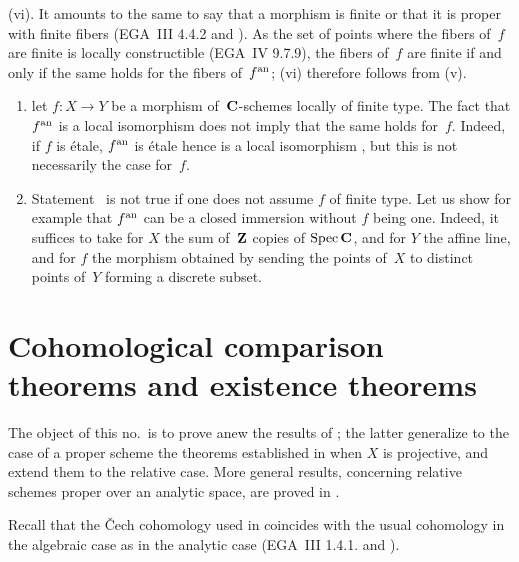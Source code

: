(vi). It amounts to the same to say that a morphism is finite or that it
is proper with finite fibers (EGA~III 4.4.2 and \cite[ \S 5]{XII.4}).
As the set of points where the fibers of~$f$ are finite is
locally constructible (EGA~IV 9.7.9), the fibers of~$f$ are finite
if and only if the same holds for the fibers of~$f^{\mathrm{an}} $; (vi)
therefore follows from (v).

\begin{remark}
\label{XII.3.3}
\begin{enumerate}
\item[a)] let $f \colon X \to Y$ be a morphism of~$\mathbf{C}$-schemes
locally of finite type. The fact that $f^{\mathrm{an}} $ is a local
isomorphism does not imply that the same holds for~$f$. Indeed,
if $f$ is étale, $f^{\mathrm{an}} $ is étale hence is a local
isomorphism \hbox{\cite[ \S 1]{XII.4}}, but this is not necessarily the case
for~$f$.
\item[b)]
Statement~
is not true if one does not assume
$f$ of finite type. Let us show for example that $f^{\mathrm{an}} $ can be
a closed immersion without $f$ being one. Indeed, it
suffices to take for $X$ the sum of~$\mathbf{Z} $ copies of
$\operatorname{Spec} \mathbf{C}$, and for $Y$ the affine line, and for $f$ the morphism
obtained by sending the points of~$X$ to distinct points of~$Y$
forming a discrete subset.
\end{enumerate}
\end{remark}

\section[Cohomological comparison theorems]{Cohomological comparison theorems and existence theorems}
\label{XII.4}

The object of this no.\ is to prove anew the results of
\cite[ th and th]{XII.3}; the latter generalize to the case
of a proper scheme the theorems established in \cite[]{XII.10} when $X$ is projective, and extend them to the
relative case. More general results, concerning
relative schemes proper over an analytic space, are
proved in \cite[ch\ptbl VIII ]{XII.7}.

Recall that the {\v{C}}ech cohomology used in \cite[]{XII.10} coincides with the usual cohomology in the
algebraic case as in the analytic case (EGA~III 1.4.1. and \cite[II 5.10]{XII.5}).
